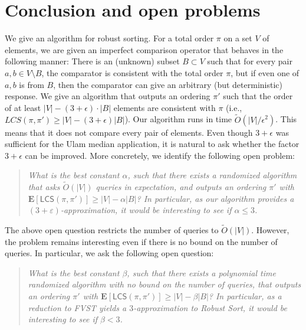 \documentclass[11pt]{llncs}
\newcommand{\eps}{\varepsilon}
\newcommand{\E}{\mathbf{E}}
\newcommand{\robust}{{\textsf{Robust Sort}}\xspace}
\newcommand{\LCS}{{\textsf{LCS}}}
\begin{document}
\section{Conclusion and open problems}
We give an algorithm for robust sorting. For a total order $\pi$ on a set $V$ of elements, we are given an imperfect comparison operator that behaves in the following manner: There is an (unknown) subset $B \subset V$ such that for every pair $a, b \in V\setminus B$, the comparator is consistent with the total order $\pi$, but if even one of $a, b$ is from $B$, then the comparator can give an arbitrary (but deterministic) response. We give an algorithm that outputs an ordering $\pi'$ such that the order of at least $|V| - (3+\epsilon) \cdot |B|$ elements are consistent with $\pi$ (i.e., $LCS(\pi, \pi') \geq |V| - (3+\epsilon)|B|$). Our algorithm runs in time $\tilde{O}(|V|/\epsilon^2)$. This means that it does not compare every pair of elements. 
Even though $3 + \epsilon$ was sufficient for the Ulam median application, it is natural to ask whether the factor $3 + \epsilon$ can be improved. More concretely, we identify the following open problem: 



\begin{quote}
    {\em What is the best constant $\alpha$, such that there exists a randomized algorithm that asks $\tilde{O}(|V|)$ queries in expectation, and outputs an ordering $\pi'$ with $\E[\LCS(\pi, \pi')] \geq |V| -  \alpha |B|$? In particular, as our algorithm provides a $(3+\eps)$-approximation, it would be interesting to see if $\alpha \leq 3$.}
\end{quote}
   

The above open question restricts the number of queries to $\tilde{O}(|V|)$. However, the problem remains interesting even if there is no bound on the number of queries. In particular, we ask the following open question:
    \begin{quote}
        
     {\em What is the best constant $\beta$, such that there exists a polynomial time randomized algorithm with no bound on the number of queries, that outputs an ordering $\pi'$ with $\E[\LCS(\pi, \pi')] \geq |V| -  \beta |B|$? In particular, as a reduction to FVST yields a $3$-approximation to \robust, it would be interesting to see if $\beta < 3$.}
    \end{quote}
\end{document}
